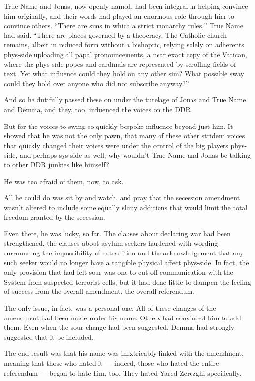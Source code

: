 True Name and Jonas, now openly named, had been integral in helping convince him originally, and their words had played an enormous role through him to convince others. ``There are sims in which a strict monarchy rules,'' True Name had said. ``There are places governed by a theocracy. The Catholic church remains, albeit in reduced form without a bishopric, relying solely on adherents phys-side uploading all papal pronouncements, a near exact copy of the Vatican, where the phys-side popes and cardinals are represented by scrolling fields of text. Yet what influence could they hold on any other sim? What possible sway could they hold over anyone who did not subscribe anyway?''

And so he dutifully passed these on under the tutelage of Jonas and True Name and Demma, and they, too, influenced the voices on the DDR.

But for the voices to swing so quickly bespoke influence beyond just him. It showed that he was not the only pawn, that many of these other strident voices that quickly changed their voices were under the control of the big players phys-side, and perhaps sys-side as well; why wouldn't True Name and Jonas be talking to other DDR junkies like himself?

He was too afraid of them, now, to ask.

All he could do was sit by and watch, and pray that the secession amendment wasn't altered to include some equally slimy additions that would limit the total freedom granted by the secession.

Even there, he was lucky, so far. The clauses about declaring war had been strengthened, the clauses about asylum seekers hardened with wording surrounding the impossibility of extradition and the acknowledgement that any such seeker would no longer have a tangible physical affect phys-side. In fact, the only provision that had felt sour was one to cut off communication with the System from suspected terrorist cells, but it had done little to dampen the feeling of success from the overall amendment, the overall referendum.

The only issue, in fact, was a personal one. All of these changes of the amendment had been made under his name. Others had convinced him to add them. Even when the sour change had been suggested, Demma had strongly suggested that it be included.

The end result was that his name was inextricably linked with the amendment, meaning that those who hated it — indeed, those who hated the entire referendum — began to hate him, too. They hated Yared Zerezghi specifically.

